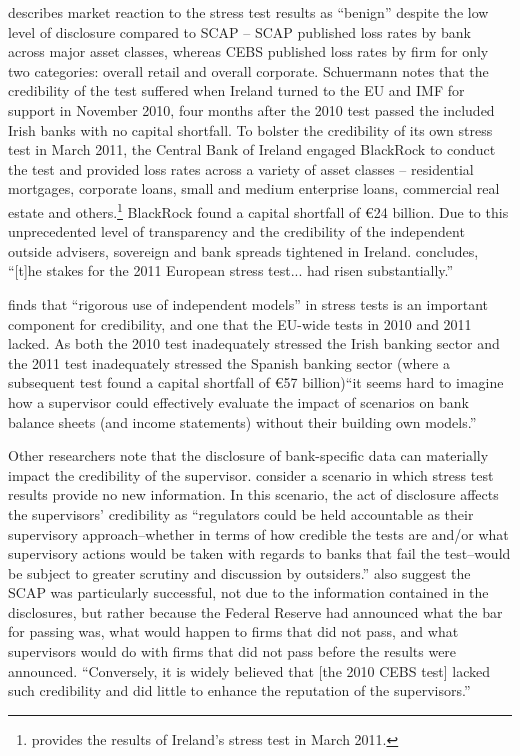 \documentclass[12pt]{article}
\begin{document}
\citet{Schuermann2011} describes market reaction to the stress test results as ``benign'' despite the low level of disclosure compared to SCAP -- SCAP published loss rates by bank across major asset classes, whereas CEBS published loss rates by firm for only two categories: overall retail and overall corporate. Schuermann notes that the credibility of the test suffered when Ireland turned to the EU and IMF for support in November 2010, four months after the 2010 test passed the included Irish banks with no capital shortfall. To bolster the credibility of its own stress test in March 2011, the Central Bank of Ireland engaged BlackRock to conduct the test and provided loss rates across a variety of asset classes -- residential mortgages, corporate loans, small and medium enterprise loans, commercial real estate and others.\footnote{\citet{Ireland} provides the results of Ireland's stress test in March 2011.} BlackRock found a capital shortfall of \euro{24} billion. Due to this unprecedented level of transparency and the credibility of the independent outside advisers, sovereign and bank spreads tightened in Ireland. \citet{Schuermann2011} concludes, ``[t]he stakes for the 2011 European stress test... had risen substantially.''

\citet{Schuermann2016} finds that ``rigorous use of independent models'' in stress tests is an important component for credibility, and one that the EU-wide tests in 2010 and 2011 lacked. As both the 2010 test inadequately stressed the Irish banking sector and the 2011 test inadequately stressed the Spanish banking sector (where a subsequent test found a capital shortfall of \euro{57} billion)``it seems hard to imagine how a supervisor could effectively evaluate the impact of scenarios on bank balance sheets (and income statements) without their building own models.''

Other researchers note that the disclosure of bank-specific data can materially impact the credibility of the supervisor. \citet{Itay} consider a scenario in which stress test results provide no new information. In this scenario, the act of disclosure affects the supervisors' credibility as ``regulators could be held accountable as their supervisory approach--whether in terms of how credible the tests are and/or what supervisory actions would be taken with regards to banks that fail the test--would be subject to greater scrutiny and discussion by outsiders.'' \citet{Itay} also suggest the SCAP was particularly successful, not due to the information contained in the disclosures, but rather because the Federal Reserve had announced what the bar for passing was, what would happen to firms that did not pass, and what supervisors would do with firms that did not pass before the results were announced. ``Conversely, it is widely believed that [the 2010 CEBS test] lacked such credibility and did little to enhance the reputation of the supervisors.''
\end{document}

